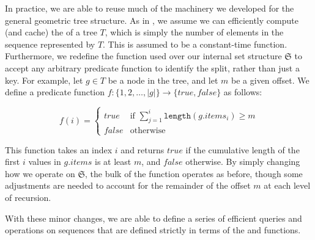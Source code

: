 \documentclass{article}
\let\oldnl\nl%
\newcommand{\nonl}{\renewcommand{\nl}{\let\nl\oldnl}}%
\begin{document}
In practice, we are able to reuse much of the machinery we developed for the general geometric tree structure. As in \cite{pugh1989incremental}, we assume we can efficiently compute (and cache) the \length of a tree $T$, which is simply the number of elements in the sequence represented by $T$. This is assumed to be a constant-time function. Furthermore, we redefine the \split function used over our internal set structure $\mathfrak{S}$ to accept any arbitrary predicate function to identify the split, rather than just a key. For example, let $g \in T$ be a node in the tree, and let $m$ be a given offset. We define a predicate function $f: \{1, 2, \dots, |g|\} \rightarrow \{true, false\}$ as follows:

$$
    f(i) =
    \begin{cases}
        true  & \text{if } \sum_{j=1}^{i} \texttt{length}(g.items_i) \geq m \\
        false & \text{otherwise}
    \end{cases}
$$

\noindent This function takes an index $i$ and returns $true$ if the cumulative length of the first $i$ values in $g.items$ is at least $m$, and $false$ otherwise. By simply changing how we operate on $\mathfrak{S}$, the bulk of the \unzip function operates as before, though some adjustments are needed to account for the remainder of the offset $m$ at each level of recursion.

\begin{algorithm}[!htb]
    \caption{Queries on sequences using geometric trees}\label{alg:sequence-queries}
    \DontPrintSemicolon

    \nonl\;
    \setcounter{AlgoLine}{0}
\end{algorithm}

With these minor changes, we are able to define a series of efficient queries and operations on sequences that are defined strictly in terms of the \zip and \unzip functions.
\end{document}
